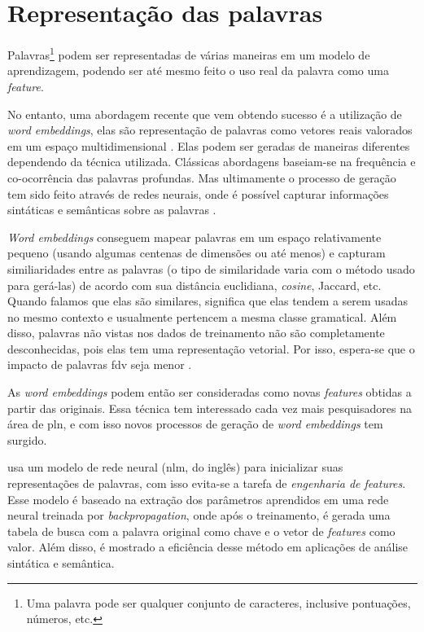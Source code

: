 \section{Representação das palavras}\label{sec:representacaodaspalavras}

Palavras\footnote{Uma palavra pode ser qualquer conjunto de caracteres, inclusive pontuações, números, etc.} podem ser representadas de várias maneiras em um modelo de aprendizagem, podendo ser até mesmo feito o uso real da palavra como uma \textit{feature}.

No entanto, uma abordagem recente que vem obtendo sucesso é a utilização de \textit{word embeddings}, elas são representação de palavras como vetores reais valorados em um espaço multidimensional \cite{turian2010word}. Elas podem ser geradas de maneiras diferentes dependendo da técnica utilizada. Clássicas abordagens baseiam-se na frequência e co-ocorrência das palavras profundas. Mas ultimamente o processo de geração tem sido feito através de redes neurais, onde é possível capturar informações sintáticas e semânticas sobre as palavras \cite{collobert2011natural}.

\textit{Word embeddings} conseguem mapear palavras em um espaço relativamente pequeno (usando algumas centenas de dimensões ou até menos) e capturam similiaridades entre as palavras (o tipo de similaridade varia com o método usado para gerá-las) de acordo com sua distância euclidiana, \textit{cosine}, Jaccard, etc. Quando falamos que elas são similares, significa que elas tendem a serem usadas no mesmo contexto e usualmente pertencem a mesma classe gramatical. Além disso, palavras não vistas nos dados de treinamento não são completamente desconhecidas, pois elas tem uma representação vetorial. Por isso, espera-se que o impacto de palavras \ac{fdv} seja menor \cite{fonseca2015evaluating}.

As \textit{word embeddings} podem então ser consideradas como novas \textit{features} obtidas a partir das originais. Essa técnica tem interessado cada vez mais pesquisadores na área de \ac{pln}, e com isso novos processos de geração de \textit{word embeddings} tem surgido.

 usa um modelo de rede neural (\ac{nlm}, do inglês) para inicializar suas representações de palavras, com isso evita-se a tarefa de \textit{engenharia de features}. Esse modelo é baseado na extração dos parâmetros aprendidos em uma rede neural treinada por \textit{backpropagation}, onde após o treinamento, é gerada uma tabela de busca com a palavra original como chave e o vetor de \textit{features} como valor. Além disso, é mostrado a eficiência desse método em aplicações de análise sintática e semântica.

